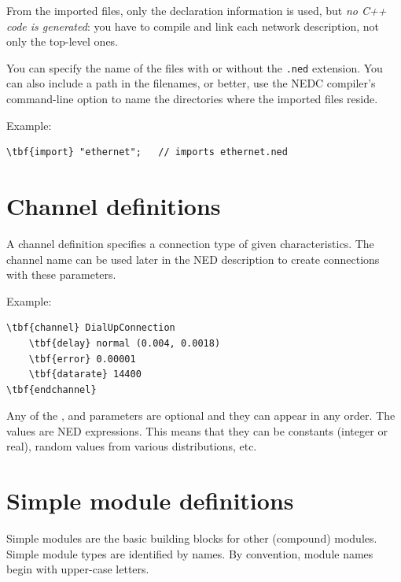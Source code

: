 From the imported files, only the declaration information is used, but
\textit{no C++ code is generated}: you have to compile and link each
network description, not only the top-level ones.

You can specify the name of the files with or without the
\texttt{.ned} extension. You can also include a path in the
filenames, or better, use the NEDC compiler's
 command-line option to name the directories where the
imported files reside.

Example:

\begin{Verbatim}[commandchars=\\\{\}]
\tbf{import} "ethernet";   // imports ethernet.ned
\end{Verbatim}




\section{Channel definitions}


A channel definition specifies a connection type of given characteristics.
The channel name can be used later in the NED description to
create connections with these parameters.


Example:

\begin{Verbatim}[commandchars=\\\{\}]
\tbf{channel} DialUpConnection
    \tbf{delay} normal (0.004, 0.0018)
    \tbf{error} 0.00001
    \tbf{datarate} 14400
\tbf{endchannel}
\end{Verbatim}

Any of the ,  and  parameters
are optional and they can appear in any order. The values are NED
expressions.  This means that they can be
constants (integer or real), random values from various distributions,
etc.




\section{Simple module definitions}


Simple modules are the basic building blocks for other (compound)
modules. Simple module types are identified by names.
By convention, module names begin with upper-case letters.

